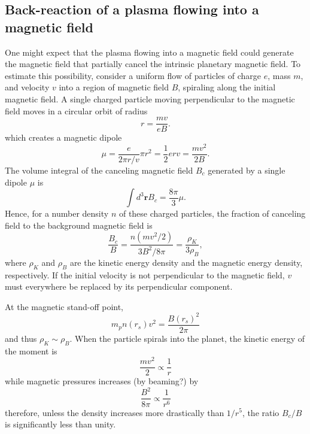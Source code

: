 \documentclass{emulateapj}
\begin{document}
\newpage


\subsection{Back-reaction of a plasma flowing into a magnetic field}
\label{ss:offset}

One might expect that the plasma flowing into a magnetic field could generate the magnetic field that partially cancel the intrinsic planetary magnetic field. 
To estimate this possibility, consider a uniform flow of particles of charge $e$, mass $m$, and velocity $v$ into a region of magnetic field $B$, spiraling along the initial magnetic field. 
A single charged particle moving perpendicular to the magnetic field moves in a circular orbit of radius 
\begin{equation}
r=\frac{mv}{eB}.
\end{equation}
which creates a magnetic dipole
\begin{equation}
\mu = \frac{e}{2\pi r/v} \pi r^2 = \frac{1}{2} e r v = \frac{mv^2}{2B}.
\end{equation}
The volume integral of the canceling magnetic field $B_c$ generated by a single dipole $\mu$ is
\begin{equation}
\int d^3{\boldsymbol r} B_c = \frac{8\pi}{3} \mu.
\end{equation}
Hence, for a number density $n$ of these charged particles, the fraction of canceling field to the background magnetic field is
\begin{equation}
\frac{B_c}{B} = \frac{n(mv^2/2)}{3 B^2/8\pi}= \frac{\rho_K}{3\rho_B},
\end{equation}
where $\rho_K$ and $\rho_B$ are the kinetic energy density and the magnetic energy density, respectively. If the initial velocity is not perpendicular to the magnetic field, $v$ must everywhere be replaced by its perpendicular component.

%
At the magnetic stand-off point, 
\begin{equation}
m_p n(r_s) v^2 = \frac{B(r_s)^2}{2\pi }
\end{equation}
and thus $\rho_K \sim \rho _B$. When the particle spirals into the planet, the kinetic energy of the moment is
\begin{equation}
\frac{mv^2}{2} \propto \frac{1}{r}
\end{equation}
while magnetic pressures increases (by beaming?) by 
\begin{equation}
\frac{B^2}{8\pi } \propto \frac{1}{r^6}
\end{equation}
therefore, unless the density increases more drastically than $1/r^5$, the ratio $B_c/B$ is significantly less than unity. 
\end{document}
